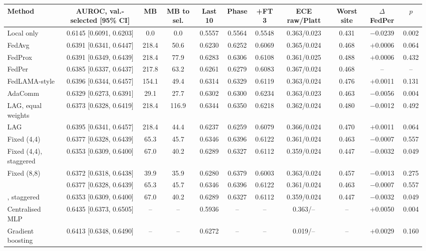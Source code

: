 \begin{tabular}{@{}lcccccccccc@{}}
\toprule
Method & AUROC, val.-selected [95\% CI] & MB & MB to sel. & Last 10 & Phase & +FT 3 & ECE raw/Platt & Worst site & $\Delta$ FedPer & $p$\\
\midrule
Local only & 0.6145 [0.6091, 0.6203] & 0.0 & 0.0 & 0.5557 & 0.5564 & 0.5548 & 0.363/0.023 & 0.431 & \ensuremath{-}0.0239 & 0.002\\
FedAvg & 0.6391 [0.6341, 0.6447] & 218.4 & 50.6 & 0.6230 & 0.6252 & 0.6069 & 0.365/0.024 & 0.468 & \ensuremath{+}0.0006 & 0.064\\
FedProx & 0.6391 [0.6349, 0.6439] & 218.4 & 77.9 & 0.6283 & 0.6306 & 0.6108 & 0.361/0.025 & 0.488 & \ensuremath{+}0.0006 & 0.432\\
FedPer & 0.6385 [0.6337, 0.6437] & 217.8 & 63.2 & 0.6261 & 0.6279 & 0.6083 & 0.367/0.024 & 0.468 & -- & --\\
FedLAMA-style & 0.6396 [0.6344, 0.6457] & 154.1 & 49.4 & 0.6314 & 0.6329 & 0.6119 & 0.363/0.024 & 0.476 & \ensuremath{+}0.0011 & 0.131\\
AdaComm & 0.6329 [0.6273, 0.6391] & 29.1 & 27.7 & 0.6302 & 0.6300 & 0.6234 & 0.363/0.023 & 0.463 & \ensuremath{-}0.0056 & 0.004\\
LAG, equal weights & 0.6373 [0.6328, 0.6419] & 218.4 & 116.9 & 0.6344 & 0.6350 & 0.6218 & 0.362/0.024 & 0.480 & \ensuremath{-}0.0012 & 0.492\\
LAG & 0.6395 [0.6341, 0.6457] & 218.4 & 44.4 & 0.6237 & 0.6259 & 0.6079 & 0.366/0.024 & 0.470 & \ensuremath{+}0.0011 & 0.064\\
Fixed (4,4) & 0.6377 [0.6328, 0.6439] & 65.3 & 45.7 & 0.6346 & 0.6396 & 0.6122 & 0.361/0.024 & 0.463 & \ensuremath{-}0.0007 & 0.557\\
Fixed (4,4), staggered & 0.6353 [0.6309, 0.6400] & 67.0 & 40.2 & 0.6289 & 0.6327 & 0.6112 & 0.359/0.024 & 0.447 & \ensuremath{-}0.0032 & 0.049\\
Fixed (8,8) & 0.6372 [0.6318, 0.6438] & 39.9 & 35.9 & 0.6280 & 0.6379 & 0.6003 & 0.363/0.024 & 0.457 & \ensuremath{-}0.0013 & 0.275\\
\tierfed{} & 0.6377 [0.6328, 0.6439] & 65.3 & 45.7 & 0.6346 & 0.6396 & 0.6122 & 0.361/0.024 & 0.463 & \ensuremath{-}0.0007 & 0.557\\
\tierfed{}, staggered & 0.6353 [0.6309, 0.6400] & 67.0 & 40.2 & 0.6289 & 0.6327 & 0.6112 & 0.359/0.024 & 0.447 & \ensuremath{-}0.0032 & 0.049\\
Centralised MLP & 0.6435 [0.6373, 0.6505] & -- & -- & 0.5936 & -- & -- & 0.363/-- & -- & \ensuremath{+}0.0050 & 0.004\\
Gradient boosting & 0.6413 [0.6348, 0.6490] & -- & -- & 0.6272 & -- & -- & 0.019/-- & -- & \ensuremath{+}0.0029 & 0.160\\
\bottomrule
\end{tabular}
